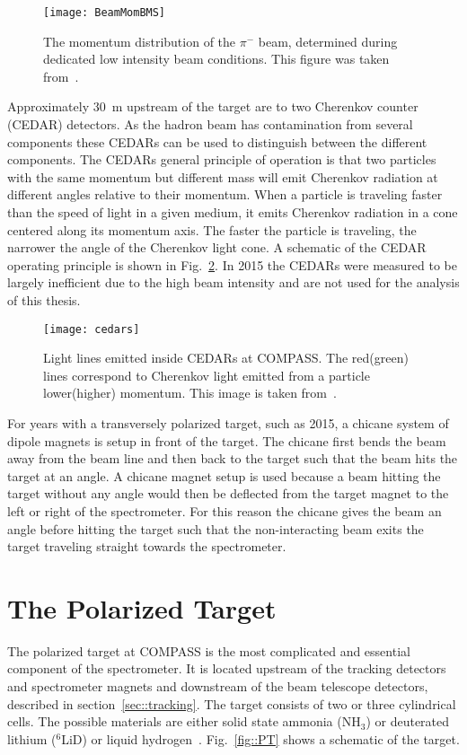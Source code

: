 \begin{figure}[h!t]
  \centering
  \texttt{[image: BeamMomBMS]}
  \caption{The momentum distribution of the $\pi^-$ beam, determined during
    dedicated low intensity beam conditions.  This figure was taken
    from~\cite{COMPbeamProp}.}
  \label{fig::BeamMomBMS}
\end{figure}

Approximately 30~m upstream of the target are to two Cherenkov counter (CEDAR)
detectors.  As the hadron beam has contamination from several components these
CEDARs can be used to distinguish between the different components.  The CEDARs
general principle of operation is that two particles with the same momentum but
different mass will emit Cherenkov radiation at different angles relative to
their momentum.  When a particle is traveling faster than the speed of light in
a given medium, it emits Cherenkov radiation in a cone centered along its
momentum axis.  The faster the particle is traveling, the narrower the angle of
the Cherenkov light cone.  A schematic of the CEDAR operating principle is shown
in Fig.~\ref{fig::cedars}.  In 2015 the CEDARs were measured to be largely
inefficient due to the high beam intensity and are not used for the analysis of
this thesis.

\begin{figure}[h!t]
  \centering
  \texttt{[image: cedars]}
  \caption{Light lines emitted inside CEDARs at COMPASS.  The red(green) lines
    correspond to Cherenkov light emitted from a particle lower(higher)
    momentum.  This image is taken from~\cite{ABBON201569}.}
  \label{fig::cedars}
\end{figure}

For years with a transversely polarized target, such as 2015, a chicane system
of dipole magnets is setup in front of the target.  The chicane first bends the
beam away from the beam line and then back to the target such that the beam hits
the target at an angle.  A chicane magnet setup is used because a beam hitting
the target without any angle would then be deflected from the target magnet to
the left or right of the spectrometer.  For this reason the chicane gives the
beam an angle before hitting the target such that the non-interacting beam exits
the target traveling straight towards the spectrometer.


\section{The Polarized Target} \label{sec::polTarget}
The polarized target at COMPASS is the most complicated and essential component
of the spectrometer.  It is located upstream of the tracking detectors and
spectrometer magnets and downstream of the beam telescope detectors, described
in section~\ref{sec::tracking}.  The target consists of two or three cylindrical
cells.  The possible materials are either solid state ammonia (NH$_3$) or
deuterated lithium ($^6$LiD) or liquid
hydrogen~\cite{Matousek:2017rvj,Koivuniemi:2015uyw,GenkiPolTarget}.
Fig.~\ref{fig::PT} shows a schematic of the target.  \par

